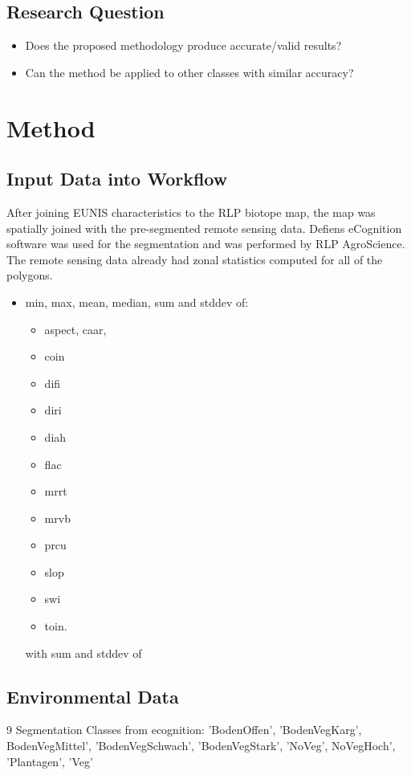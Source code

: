 \documentclass[a4paper,12pt]{article}
\begin{document}
\subsection{Research Question}
\begin{itemize}
  \item Does the proposed methodology produce accurate/valid results?
  \item Can the method be applied to other classes with similar accuracy?
\end{itemize}
\section{Method}
\subsection{Input Data into Workflow}
After joining EUNIS characteristics to the RLP biotope map, the map was 
spatially joined with the pre-segmented remote sensing data. Defiens eCognition
software was used for the segmentation and was performed by RLP AgroScience. 
The remote sensing data already had zonal statistics computed for all of the
polygons.
\begin{itemize}
  \item min, max, mean, median, sum and stddev of:
  \begin{itemize}
    \item aspect, caar,
	\item coin
	\item difi
	\item diri
	\item diah
	\item flac
	\item mrrt
	\item mrvb
	\item prcu
	\item slop
	\item swi
	\item toin.
  \end{itemize}with  sum and stddev of 
\end{itemize}


\subsection{Environmental Data}

9 Segmentation Classes from ecognition:
'BodenOffen', 'BodenVegKarg', BodenVegMittel', 'BodenVegSchwach',
'BodenVegStark', 'NoVeg', NoVegHoch', 'Plantagen', 'Veg'
\end{document}
